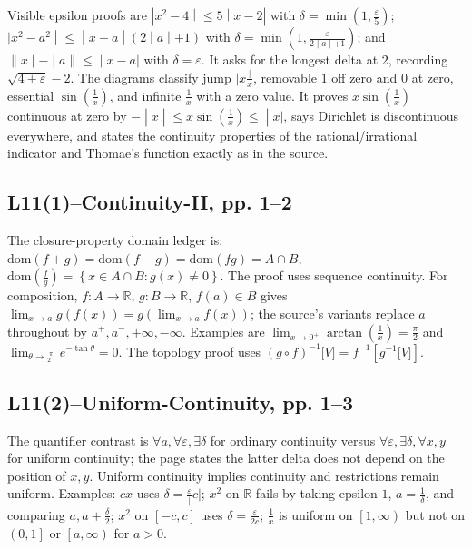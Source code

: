 Visible epsilon proofs are \(\left. |x^{2} - 4 \middle| \leq 5 \middle| x - 2| \right.\) with \(\delta = \min\left( {1,\frac{\varepsilon}{5}} \right)\); \(\left. |x^{2} - a^{2} \middle| \leq \middle| x - a \middle| \left( 2 \middle| a \middle| + 1 \right) \right.\) with \(\delta = \min\left( {1,\frac{\varepsilon}{\left. 2 \middle| a \middle| + 1 \right.}} \right)\); and \(\left. \| x \middle| - \middle| a\| \leq \middle| x - a| \right.\) with \(\delta = \varepsilon\). It asks for the longest delta at \(2\), recording \(\sqrt{4 + \varepsilon} - 2\). The diagrams classify jump \(|x\frac{|}{x}\), removable \(1\) off zero and \(0\) at zero, essential \(\sin\left( \frac{1}{x} \right)\), and infinite \(\frac{1}{x}\) with a zero value. It proves \(x\sin\left( \frac{1}{x} \right)\) continuous at zero by \(\left. - \middle| x \middle| \leq x\sin\left( \frac{1}{x} \right) \leq \middle| x| \right.\), says Dirichlet is discontinuous everywhere, and states the continuity properties of the rational/irrational indicator and Thomae's function exactly as in the source.

\subsection{L11(1)--Continuity-II, pp. 1--2}

The closure-property domain ledger is: \(\text{dom}\left( {f + g} \right) = \text{dom}\left( {f - g} \right) = \text{dom}\left( {fg} \right) = A \cap B\), \(\text{dom}\left( \frac{f}{g} \right) = \left\{ {x \in A \cap B:g(x) \neq 0} \right\}\). The proof uses sequence continuity. For composition, \(f:A\rightarrow\mathbb{R}\), \(g:B\rightarrow\mathbb{R}\), \(f(a) \in B\) gives \(\lim_{x\rightarrow a}g\left( {f(x)} \right) = g\left( {\lim_{x\rightarrow a}f(x)} \right)\); the source's variants replace \(a\) throughout by \(a^{+},a^{-}, + \infty, - \infty\). Examples are \(\lim_{x\rightarrow 0^{+}}\arctan\left( \frac{1}{x} \right) = \frac{\pi}{2}\) and \(\lim_{\theta\rightarrow\frac{\pi}{2^{-}}}e^{- \tan\theta} = 0\). The topology proof uses \(\left( {g \circ f} \right)^{- 1}\lbrack V\rbrack = f^{- 1}\left\lbrack {g^{- 1}\lbrack V\rbrack} \right\rbrack\).

\subsection{L11(2)--Uniform-Continuity, pp. 1--3}

The quantifier contrast is \(\forall a,\forall\varepsilon,\exists\delta\) for ordinary continuity versus \(\forall\varepsilon,\exists\delta,\forall x,y\) for uniform continuity; the page states the latter delta does not depend on the position of \(x,y\). Uniform continuity implies continuity and restrictions remain uniform. Examples: \(cx\) uses \(\delta = \frac{\varepsilon}{|}c|\); \(x^{2}\) on \(\mathbb{R}\) fails by taking epsilon \(1\), \(a = \frac{1}{\delta}\), and comparing \(a,a + \frac{\delta}{2}\); \(x^{2}\) on \(\left\lbrack {- c,c} \right\rbrack\) uses \(\delta = \frac{\varepsilon}{2c}\); \(\frac{1}{x}\) is uniform on \(\left\lbrack {1,\infty} \right)\) but not on \(\left( {0,1} \right\rbrack\) or \(\left\lbrack {a,\infty} \right)\) for \(a > 0\).


